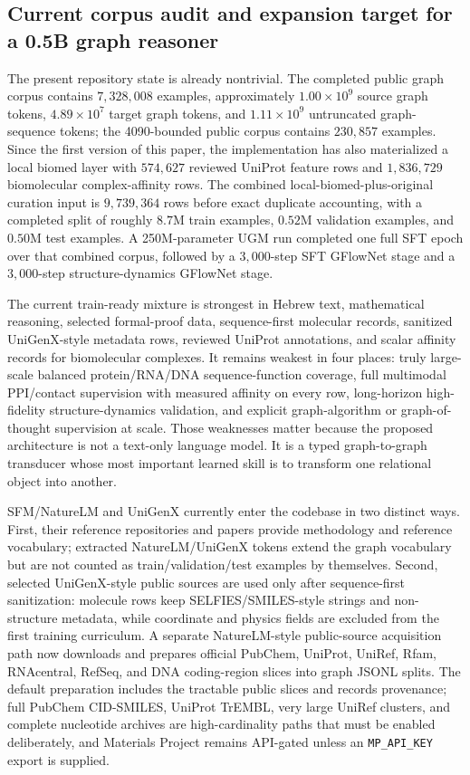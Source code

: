 \documentclass[11pt]{article}
\newcommand{\1}{\mathbf{1}}
\begin{document}
\subsection{Current corpus audit and expansion target for a 0.5B graph reasoner}
\label{sec:dataset-expansion-audit}

The present repository state is already nontrivial. The completed public graph corpus contains $7{,}328{,}008$ examples, approximately $1.00\times 10^9$ source graph tokens, $4.89\times 10^7$ target graph tokens, and $1.11\times 10^9$ untruncated graph-sequence tokens; the 4090-bounded public corpus contains $230{,}857$ examples. Since the first version of this paper, the implementation has also materialized a local biomed layer with $574{,}627$ reviewed UniProt feature rows and $1{,}836{,}729$ biomolecular complex-affinity rows. The combined local-biomed-plus-original curation input is $9{,}739{,}364$ rows before exact duplicate accounting, with a completed split of roughly $8.7$M train examples, $0.52$M validation examples, and $0.50$M test examples. A 250M-parameter UGM run completed one full SFT epoch over that combined corpus, followed by a $3{,}000$-step SFT GFlowNet stage and a $3{,}000$-step structure-dynamics GFlowNet stage.

The current train-ready mixture is strongest in Hebrew text, mathematical reasoning, selected formal-proof data, sequence-first molecular records, sanitized UniGenX-style metadata rows, reviewed UniProt annotations, and scalar affinity records for biomolecular complexes. It remains weakest in four places: truly large-scale balanced protein/RNA/DNA sequence-function coverage, full multimodal PPI/contact supervision with measured affinity on every row, long-horizon high-fidelity structure-dynamics validation, and explicit graph-algorithm or graph-of-thought supervision at scale. Those weaknesses matter because the proposed architecture is not a text-only language model. It is a typed graph-to-graph transducer whose most important learned skill is to transform one relational object into another.

SFM/NatureLM and UniGenX currently enter the codebase in two distinct ways. First, their reference repositories and papers provide methodology and reference vocabulary; extracted NatureLM/UniGenX tokens extend the graph vocabulary but are not counted as train/validation/test examples by themselves. Second, selected UniGenX-style public sources are used only after sequence-first sanitization: molecule rows keep SELFIES/SMILES-style strings and non-structure metadata, while coordinate and physics fields are excluded from the first training curriculum. A separate NatureLM-style public-source acquisition path now downloads and prepares official PubChem, UniProt, UniRef, Rfam, RNAcentral, RefSeq, and DNA coding-region slices into graph JSONL splits. The default preparation includes the tractable public slices and records provenance; full PubChem CID-SMILES, UniProt TrEMBL, very large UniRef clusters, and complete nucleotide archives are high-cardinality paths that must be enabled deliberately, and Materials Project remains API-gated unless an \texttt{MP\_API\_KEY} export is supplied.
\end{document}

